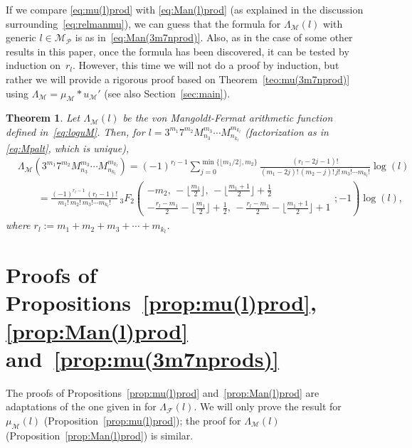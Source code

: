 \documentclass[11pt, a4paper]{article}
\newcommand{\manF}{\Lambda_{\mathcal{F}}}
\newcommand{\calM}{\mathcal{M}}
\newcommand{\manM}{\Lambda_{\calM}}
\newcommand{\uM}{u_\calM}
\newcommand{\muM}{\mu_\calM}
\newcommand{\Mp}{\calM_{\mathcal{P}}}
\theoremstyle{plain}
\newtheorem{theorem}{Theorem}
\theoremstyle{definition}
\begin{document}
If we compare \eqref{eq:mu(l)prod} with \eqref{eq:Man(l)prod} (as explained in the discussion surrounding~\eqref{eq:relmanmu}), we can guess that the formula for $\manM(l)$ with generic $l \in \Mp$ is as in~\eqref{eq:Man(3m7nprod)}. 
Also, as in the case of some other results in this paper, once the formula has been discovered, it can be tested by induction on~$r_l$.
However, this time we will not do a proof by induction, but rather we will provide a rigorous proof based on Theorem~\ref{teo:mu(3m7nprod)} using $\manM = \muM * \uM'$ (see also Section~\ref{sec:main}).

\begin{theorem}
\label{teo:Man(3m7nprod)}
Let $\manM(l)$ be the von Mangoldt-Fermat arithmetic function defined in~\eqref{eq:loguM}. 
Then, for $l = 3^{m_1} 7^{m_2} M_{n_3}^{m_3} \cdots M_{n_{k_l}}^{m_{k_l}}$ (factorization as in \eqref{eq:Mpalt}, which is unique),
\begin{align}
\label{eq:Man(3m7nprod)}
  &\manM(3^{m_1} 7^{m_2} M_{n_3}^{m_3} \cdots M_{n_{k_l}}^{m_{k_l}}) 
  = (-1)^{r_l-1} \sum_{j=0}^{\min\{\lfloor m_1/2\rfloor, m_2\}} 
  \frac{(r_l-2j-1)!}{(m_1-2j)!\,(m_2-j)!\,j!\,m_3! \cdots m_{k_l}!} \log(l)\\
\nonumber
  &\qquad= \frac{(-1)^{r_l-1}\, (r_l-1)!}{m_1!\,m_2!\,m_3!\cdots m_{k_l}!}\,
  {}_3F_2 \! \left(\begin{matrix}
  -m_2,\, -\lfloor\tfrac{m_1}{2}\rfloor,\, -\lfloor\tfrac{m_1+1}{2}\rfloor + \tfrac{1}{2} \\[4pt]
  -\tfrac{r_l-m_1}{2} - \lfloor\tfrac{m_1}{2}\rfloor +  \tfrac{1}{2},\, 
    -\tfrac{r_l-m_1}{2} - \lfloor\tfrac{m_1+1}{2}\rfloor + 1
  \end{matrix}; -1 \right) \log(l),
\end{align}
where $r_l := m_1 + m_2 + m_3 + \cdots + m_{k_l}$. 
\end{theorem}

\section{Proofs of Propositions~\ref{prop:mu(l)prod}, \ref{prop:Man(l)prod} and~\ref{prop:mu(3m7nprods)}}
\label{sec:prod}

The proofs of Propositions~\ref{prop:mu(l)prod} and~\ref{prop:Man(l)prod} are adaptations of the one given in \cite[Proposition~2]{MoNaVa} for $\manF(l)$.
We will only prove the result for $\muM(l)$ (Proposition~\ref{prop:mu(l)prod}); the proof for $\manM(l)$ (Proposition~\ref{prop:Man(l)prod}) is similar.
\end{document}
